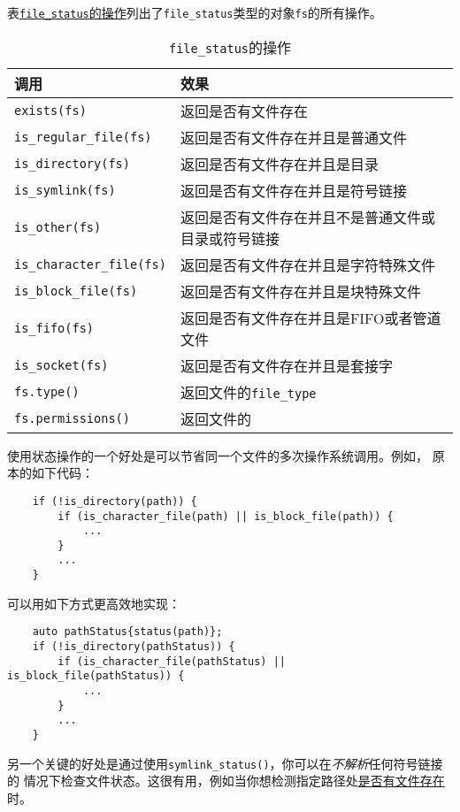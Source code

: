 表\hyperref[t20.13]{\texttt{file\_status}的操作}列出了\texttt{file\_status}类型的对象\texttt{fs}的所有操作。
\begin{table}[htb]
    \centering
    \begin{tabular}{l|l}
        \hline
        \textbf{调用}                      & \textbf{效果}               \\
        \hline
        \texttt{exists(fs)}              & 返回是否有文件存在                 \\
        \texttt{is\_regular\_file(fs)}   & 返回是否有文件存在并且是普通文件          \\
        \texttt{is\_directory(fs)}       & 返回是否有文件存在并且是目录            \\
        \texttt{is\_symlink(fs)}         & 返回是否有文件存在并且是符号链接          \\
        \texttt{is\_other(fs)}           & 返回是否有文件存在并且不是普通文件或目录或符号链接 \\
        \texttt{is\_character\_file(fs)} & 返回是否有文件存在并且是字符特殊文件        \\
        \texttt{is\_block\_file(fs)}     & 返回是否有文件存在并且是块特殊文件         \\
        \texttt{is\_fifo(fs)}            & 返回是否有文件存在并且是FIFO或者管道文件    \\
        \texttt{is\_socket(fs)}          & 返回是否有文件存在并且是套接字           \\
        \texttt{fs.type()}               & 返回文件的\texttt{file\_type}  \\
        \texttt{fs.permissions()}        & 返回文件的\nameref{ch20.4.3}   \\
        \hline
    \end{tabular}
    \caption{\texttt{file\_status}的操作}
    \label{t20.13}
\end{table}

使用状态操作的一个好处是可以节省同一个文件的多次操作系统调用。例如，
原本的如下代码：
\begin{lstlisting}
    if (!is_directory(path)) {
        if (is_character_file(path) || is_block_file(path)) {
            ...
        }
        ...
    }
\end{lstlisting}
可以用如下方式更高效地实现：
\begin{lstlisting}
    auto pathStatus{status(path)};
    if (!is_directory(pathStatus)) {
        if (is_character_file(pathStatus) || is_block_file(pathStatus)) {
            ...
        }
        ...
    }
\end{lstlisting}
另一个关键的好处是通过使用\texttt{symlink\_status()}，你可以在\emph{不解析}任何符号链接的
情况下检查文件状态。这很有用，例如当你想检测指定路径处\hyperref[ch20.4.1.1]{是否有文件存在}时。

